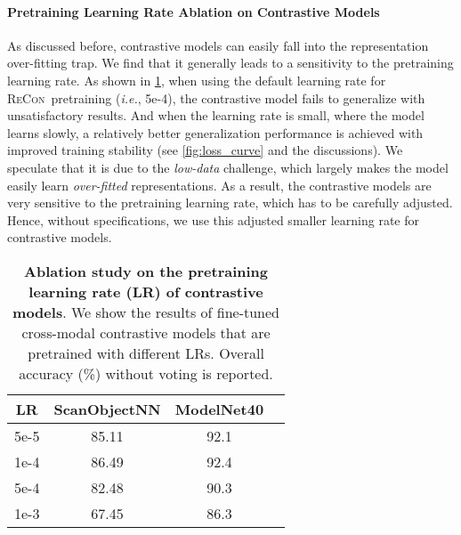 \documentclass{article}
\theoremstyle{plain}
\theoremstyle{definition}
\theoremstyle{remark}
\def\ie{{\it{i.e.}}}
\def\recon{{\scshape ReCon}}
\begin{document}
\paragraph{Pretraining Learning Rate Ablation on Contrastive Models}
As discussed before, contrastive models can easily fall into the representation over-fitting trap. We find that it generally leads to a sensitivity to the pretraining learning rate. 
As shown in \cref{tab:lr_ablation}, when using the default learning rate for \recon\ pretraining (\ie, 5e-4), the contrastive model fails to generalize with unsatisfactory results. And when the learning rate is small, where the model learns slowly, a relatively better generalization performance is achieved with improved training stability (see \cref{fig:loss_curve} and the discussions).
We speculate that it is due to the \textit{low-data} challenge, which largely makes the model easily learn \textit{over-fitted} representations. As a result, the contrastive models are very sensitive to the pretraining learning rate, which has to be carefully adjusted. Hence, without specifications, we use this adjusted smaller learning rate for contrastive models.
\begin{table}[!h]
\caption{
\textbf{Ablation study on the pretraining learning rate (LR) of contrastive models}. We show the results of fine-tuned cross-modal contrastive models that are pretrained with different LRs. Overall accuracy (\%) without voting is reported.} \label{tab:lr_ablation}
\begin{center}
\begin{tabular}{cccc}
\toprule[0.95pt]
LR & ScanObjectNN & ModelNet40\\
\midrule[0.6pt]
5e-5 & 85.11 & 92.1\\
1e-4 & 86.49 & 92.4\\
5e-4 & 82.48& 90.3\\
1e-3 & 67.45 & 86.3\\
\bottomrule[0.95pt]
\end{tabular}
\end{center}
\end{table} 
\end{document}
